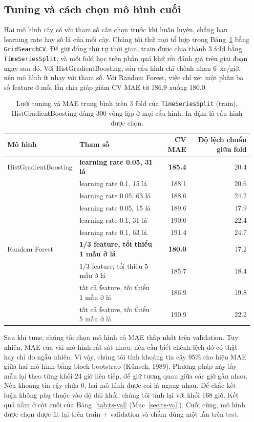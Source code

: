 \subsection{Tuning và cách chọn mô hình cuối}
\label{sec:ts-tuning}
Hai mô hình cây có vài tham số cần chọn trước khi huấn luyện, chẳng hạn learning rate hay số lá của mỗi cây. Chúng tôi thử mọi tổ hợp trong
Bảng~\ref{tab:ts-tuning} bằng \texttt{GridSearchCV}. Để giữ đúng thứ tự thời gian, train được chia thành 3 fold bằng \texttt{TimeSeriesSplit},
và mỗi fold học trên phần quá khứ rồi đánh giá trên giai đoạn ngay sau đó. Với HistGradientBoosting, sáu cấu hình chỉ chênh nhau 6~xe/giờ, nên
mô hình ít nhạy với tham số. Với Random Forest, việc chỉ xét một phần ba số feature ở mỗi lần chia giúp giảm CV MAE từ 186.9 xuống 180.0.

\begin{table}[H]
\centering
\caption{Lưới tuning và MAE trung bình trên 3 fold của \texttt{TimeSeriesSplit} (train). HistGradientBoosting dùng 300 vòng lặp ở mọi cấu hình. In đậm là cấu hình được chọn.}
\label{tab:ts-tuning}
\small
\begin{tabular}{llrr}
\toprule
Mô hình & Tham số & CV MAE & Độ lệch chuẩn giữa fold\\
\midrule
HistGradientBoosting & \textbf{learning rate 0.05, 31 lá} & \textbf{185.4} & 20.4\\
 & learning rate 0.1, 15 lá & 188.1 & 20.6\\
 & learning rate 0.05, 63 lá & 188.6 & 24.2\\
 & learning rate 0.05, 15 lá & 189.6 & 17.9\\
 & learning rate 0.1, 31 lá & 190.0 & 22.4\\
 & learning rate 0.1, 63 lá & 191.4 & 24.7\\
\midrule
Random Forest & \textbf{1/3 feature, tối thiểu 1 mẫu ở lá} & \textbf{180.0} & 17.2\\
 & 1/3 feature, tối thiểu 5 mẫu ở lá & 185.7 & 18.4\\
 & tất cả feature, tối thiểu 1 mẫu ở lá & 186.9 & 19.8\\
 & tất cả feature, tối thiểu 5 mẫu ở lá & 190.9 & 22.2\\
\bottomrule
\end{tabular}
\end{table}

Sau khi tune, chúng tôi chọn mô hình có MAE thấp nhất trên validation. Tuy nhiên, MAE của vài mô hình rất sát nhau, nên cần biết chênh lệch đó
có thật hay chỉ do ngẫu nhiên. Vì vậy, chúng tôi tính khoảng tin cậy 95\% cho hiệu MAE giữa hai mô hình bằng block bootstrap (Künsch, 1989).
Phương pháp này lấy mẫu lại theo từng khối 24 giờ liên tiếp, để giữ tương quan giữa các giờ gần nhau. Nếu khoảng tin cậy chứa 0,
hai mô hình được coi là ngang nhau. Để chắc kết luận không phụ thuộc vào độ dài khối, chúng tôi tính lại với khối 168 giờ. Kết quả nằm ở cột
cuối của Bảng~\ref{tab:ts-val} (Mục~\ref{sec:ts-val}). Cuối cùng, mô hình được chọn được fit lại trên train + validation và chấm đúng một lần trên test.

